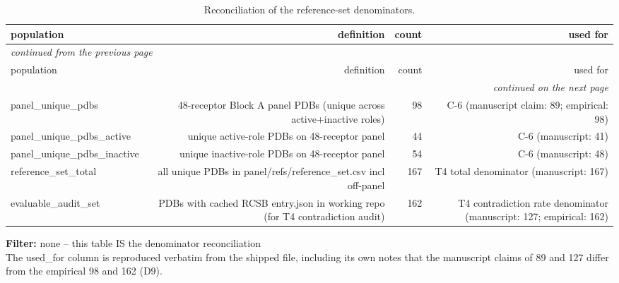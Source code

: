 \begingroup\footnotesize\setlength{\tabcolsep}{3pt}
\begin{longtable}{lrrr}
\caption{Reconciliation of the reference-set denominators.}
\label{tab:s_t3_denominators}\\
\toprule
population & definition & count & used for \\
\midrule
\endfirsthead
\multicolumn{4}{l}{\scriptsize\itshape continued from the previous page}\\
\toprule
population & definition & count & used for \\
\midrule
\endhead
\midrule
\multicolumn{4}{r}{\scriptsize\itshape continued on the next page}\\
\endfoot
\bottomrule
\endlastfoot
panel\_unique\_pdbs & 48-receptor Block A panel PDBs (unique across active+inactive roles) & 98 & C-6 (manuscript claim: 89; empirical: 98) \\
panel\_unique\_pdbs\_active & unique active-role PDBs on 48-receptor panel & 44 & C-6 (manuscript: 41) \\
panel\_unique\_pdbs\_inactive & unique inactive-role PDBs on 48-receptor panel & 54 & C-6 (manuscript: 48) \\
reference\_set\_total & all unique PDBs in panel/refs/reference\_set.csv incl off-panel & 167 & T4 total denominator (manuscript: 167) \\
evaluable\_audit\_set & PDBs with cached RCSB entry.json in working repo (for T4 contradiction audit) & 162 & T4 contradiction rate denominator (manuscript: 127; empirical: 162) \\
\end{longtable}
\begin{flushleft}\scriptsize
\textbf{Filter:} none -- this table IS the denominator reconciliation
 \\ The used\_for column is reproduced verbatim from the shipped file, including its own notes that the manuscript claims of 89 and 127 differ from the empirical 98 and 162 (D9).
\end{flushleft}
\endgroup
